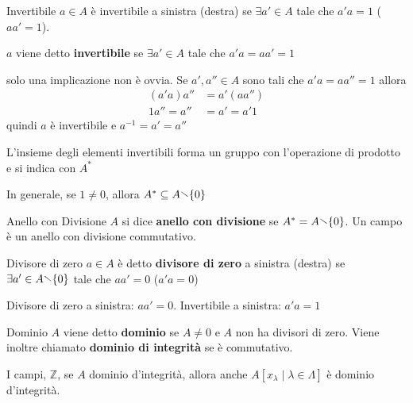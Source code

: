 \begin{definition}{Invertibile}
    \(a \in A\) è invertibile a sinistra (destra) se \(\exists a' \in A\) tale
    che \(a' a = 1\) (\(a a' = 1\)).

    \(a\) viene detto \textbf{invertibile} se \(\exists a' \in A\) tale che \(a' a = aa' = 1\)
\end{definition}
\begin{remark}
    solo una implicazione non è ovvia. Se \(a', a'' \in A\) sono tali che \(a' a
    = a a'' = 1\) allora
    \begin{align*}
        {(a' a)}a'' &= a' (a a'') \\
        1 a'' = a'' &= a' = a' 1
    \end{align*}
    quindi \(a\) è invertibile e \(a^{-1} = a' = a''\) 
\end{remark}


\begin{remark}
    L'insieme degli elementi invertibili forma un gruppo con l'operazione di
    prodotto e si indica con \(A^{*}\) 
\end{remark}

In generale, se \(1 \neq 0\), allora \(A^{*} \subseteq A \sminus \{0\}  \) 

\begin{definition}{Anello con Divisione}
    \(A\) si dice \textbf{anello con divisione} se \(A^{*} = A \sminus \{0\} \).
    Un campo è un anello con divisione commutativo.
\end{definition}

\begin{definition}{Divisore di zero}
    \(a \in A\) è detto \textbf{divisore di zero} a sinistra (destra) se \(\exists  a' \in A \sminus \{0\} \) tale che \(a a' = 0\) (\(a' a = 0\))
\end{definition}
\begin{remark}{}
    Divisore di zero a sinistra: \(aa' = 0\). Invertibile a sinistra: \(a' a = 1\) 
\end{remark}


\begin{definition}{Dominio}
    \(A\) viene detto \textbf{dominio} se \(A \neq 0\) e \(A\) non ha divisori
    di zero. Viene inoltre chiamato \textbf{dominio di integrità} se è
    commutativo.
\end{definition}
\begin{example}
    I campi, \(\mathbb{Z}\), se \(A\) dominio d'integrità, allora anche \(A[x_{\lambda} \mid \lambda \in \Lambda ]\) è dominio d'integrità.
\end{example}

